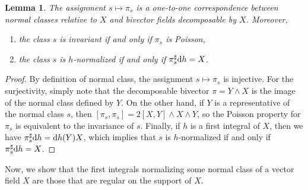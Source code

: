 \documentclass[pdftex]{sigma}%
\newcommand{\dd}{{\rm d}}
\numberwithin{equation}{section}
\newtheorem{Lemma}[Theorem]{Lemma}
\begin{document}
\begin{Lemma}\label{lemma:OneToOne}
The assignment $s \mapsto \pi_{s}$ is a one-to-one correspondence between normal classes relative to $X$ and bivector fields decomposable by $X$. Moreover,
 \begin{enumerate}\itemsep=0pt
 \item[$(i)$] the class $s$ is invariant if and only if $\pi_{s}$ is Poisson,
 \item[$(ii)$] the class $s$ is $h$-normalized if and only if $\pi_{s}^{\sharp}\dd h = X$.
 \end{enumerate}
\end{Lemma}
\begin{proof}
By definition of normal class, the assignment $s \mapsto \pi_{s}$ is injective. For the surjectivity, simply note that the decomposable bivector $\pi = Y \wedge X$ is the image of the normal class defined by $Y$. On the other hand, if $Y$ is a representative of the normal class $s$, then $[\pi_{s},\pi_{s}] = 2 [X,Y] \wedge X \wedge Y$, so the Poisson property for $\pi_{s}$ is equivalent to the invariance of $s$. Finally, if $h$ is a first integral of $X$, then we have $\pi_{s}^{\sharp}\dd h = \dd h(Y) X$, which implies that $s$ is $h$-normalized if and only if $\pi_{s}^{\sharp}\dd h = X$.
\end{proof}

Now, we show that the first integrals normalizing some normal class of a vector field $X$ are those that are regular on the support of $X$.
\end{document}

